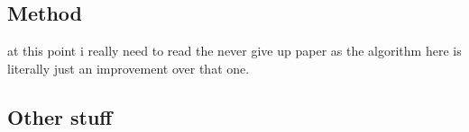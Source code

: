 \documentclass{article}
\begin{document}
\subsection{Method}
at this point i really need to read the never give up paper as the algorithm here is literally just 
an improvement over that one.

\subsection{Other stuff}
\end{document}
